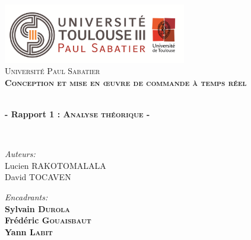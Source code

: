 
\begin{titlepage}
\begin{center}


\includegraphics[width=0.60\textwidth]{./page_de_garde/logo_ups.png}~\\[1cm]

\textsc{\LARGE Université Paul Sabatier}\\[1.5cm]

\textsc{\Large \bf Conception et mise en \oe uvre de commande à temps réel\\[0.5cm]}

\HRule \\[0.4cm]

{\huge \bfseries  - Rapport 1 : \textsc{Analyse théorique} -}

\HRule \\[1.5cm]

\begin{minipage}{0.4\textwidth}
\begin{flushleft} \large
\emph{Auteurs:}\\
Lucien \textsc{RAKOTOMALALA}\\
David \textsc{TOCAVEN}\\
\end{flushleft}
\end{minipage}
\begin{minipage}{0.58\textwidth}
\begin{flushright} \large
\emph{Encadrants:} \\
\textbf{ Sylvain \textsc{Durola}}\\
\textbf{ Frédéric \textsc{Gouaisbaut}}\\
\textbf{ Yann \textsc{Labit}}
\end{flushright}
\end{minipage}
\newline
\newline


\end{center}
\end{titlepage}
